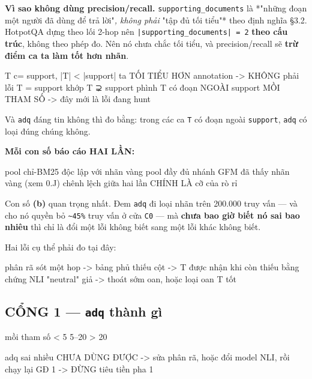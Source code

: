 \documentclass[11pt,a4paper]{article}
\begin{document}
\textbf{Vì sao không dùng precision/recall.} \texttt{supporting\_documents} là *"những đoạn một người đã
dùng để trả lời"\emph{, không phải }"tập đủ tối tiểu"* theo định nghĩa \S{}3.2. HotpotQA dựng theo lối
2-hop nên \texttt{|supporting\_documents| = 2} \textbf{theo cấu trúc}, không theo phép đo. Nên nó chưa chắc
tối tiểu, và precision/recall sẽ \textbf{trừ điểm ca ta làm tốt hơn nhãn}.

\begin{dia}
T c= support,  |T| < |support|    ta TỐI TIỂU HƠN annotation   ->  KHÔNG phải lỗi
T = support                       khớp
T ⊋ support                       phình
T có đoạn NGOÀI support           MỒI THAM SỐ  ->  đây mới là lỗi đang hunt
\end{dia}

Và \texttt{adq} đáng tin không thì đo bằng: trong các ca \texttt{T} có đoạn ngoài \texttt{support}, \texttt{adq} có loại
đúng chúng không.

\textbf{Mỗi con số báo cáo HAI LẦN:}

\begin{dia}
pool chỉ-BM25   độc lập với nhãn vàng
pool đầy đủ     nhánh GFM đã thấy nhãn vàng (xem 0.J)
chênh lệch giữa hai lần CHÍNH LÀ cỡ của rò rỉ
\end{dia}

Con số \textbf{(b)} quan trọng nhất. Đem \texttt{adq} đi loại nhãn trên 200.000 truy vấn — và cho nó
quyền bỏ \texttt{\textasciitilde{}45\%} truy vấn ở cửa \texttt{C0} — mà \textbf{chưa bao giờ biết nó sai bao nhiêu} thì chỉ là đổi
một lỗi không biết sang một lỗi khác không biết.

Hai lỗi cụ thể phải đo tại đây:

\begin{dia}
phân rã sót một hop     ->  bảng phủ thiếu cột  ->  T được nhận khi còn thiếu bằng chứng
NLI "neutral" giả       ->  thoát sớm oan, hoặc loại oan T tốt
\end{dia}

\subsection{CỔNG 1 — \texttt{adq} thành gì}

\begin{dia}
mồi tham số  < 5%
             5–20%
             > 20%

adq sai nhiều            CHƯA DÙNG ĐƯỢC
                         -> sửa phân rã, hoặc đổi model NLI, rồi chạy lại GĐ 1
                         -> ĐỪNG tiêu tiền pha 1
\end{dia}
\end{document}
